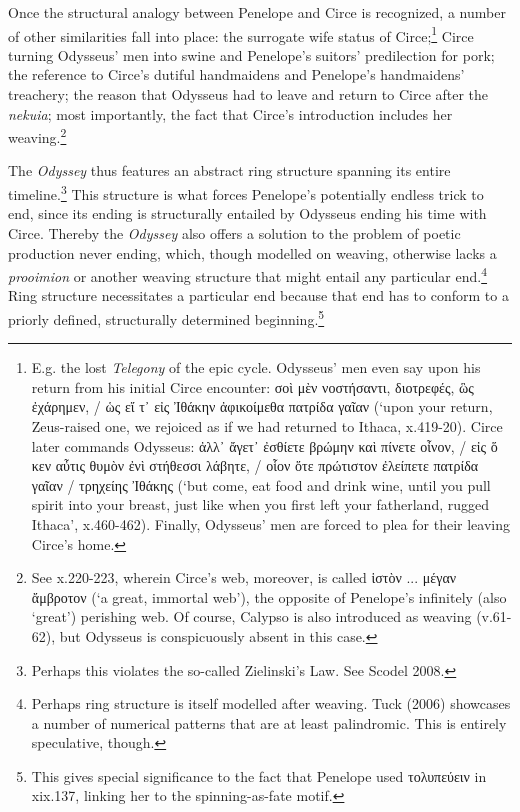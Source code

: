 \documentclass[12pt]{article}
\begin{document}
Once the structural analogy between Penelope and Circe is recognized, a number of other similarities fall into place: the surrogate wife status of Circe;\footnote{ E.g. the lost \textit{Telegony} of the epic cycle. Odysseus' men even say upon his return from his initial Circe encounter: σοὶ μὲν νοστήσαντι, διοτρεφές, ὣς ἐχάρημεν, / ὡς εἴ τ᾿ εἰς Ἰθάκην ἀφικοίμεθα πατρίδα γαῖαν (`upon your return, Zeus-raised one, we rejoiced as if we had returned to Ithaca, x.419-20). Circe later commands Odysseus: ἀλλ᾿ ἄγετ᾿ ἐσθίετε βρώμην καὶ πίνετε οἶνον, / εἰς ὅ κεν αὖτις θυμὸν ἐνὶ στήθεσσι λάβητε, / οἷον ὅτε πρώτιστον ἐλείπετε πατρίδα γαῖαν / τρηχείης Ἰθάκης (`but come, eat food and drink wine, until you pull spirit into your breast, just like when you first left your fatherland, rugged Ithaca', x.460-462). Finally, Odysseus' men are forced to plea for their leaving Circe's home.} Circe turning Odysseus' men into swine and Penelope's suitors' predilection for pork; the reference to Circe's dutiful handmaidens and Penelope's handmaidens' treachery; the reason that Odysseus had to leave and return to Circe after the \textit{nekuia}; most importantly, the fact that Circe's introduction includes her weaving.\footnote{ See x.220-223, wherein Circe's web, moreover, is called ἱστὸν ... μέγαν ἄμβροτον (`a great, immortal web'), the opposite of Penelope's infinitely (also `great') perishing web. Of course, Calypso is also introduced as weaving (v.61-62), but Odysseus is conspicuously absent in this case.}

The \textit{Odyssey} thus features an abstract ring structure spanning its entire timeline.\footnote{ Perhaps this violates the so-called Zielinski's Law. See Scodel 2008.} This structure is what forces Penelope's potentially endless trick to end, since its ending is structurally entailed by Odysseus ending his time with Circe. Thereby the \textit{Odyssey} also offers a solution to the problem of poetic production never ending, which, though modelled on weaving, otherwise lacks a \textit{prooimion} or another weaving structure that might entail any particular end.\footnote{ Perhaps ring structure is itself modelled after weaving. Tuck (2006) showcases a number of numerical patterns that are at least palindromic. This is entirely speculative, though.} Ring structure necessitates a particular end because that end has to conform to a priorly defined, structurally determined beginning.\footnote{ This gives special significance to the fact that Penelope used τολυπεύειν in xix.137, linking her to the spinning-as-fate motif.}
\end{document}
